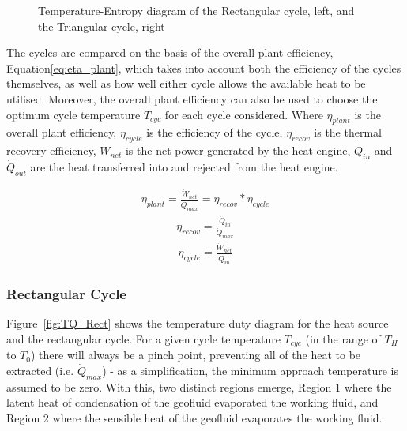         \begin{figure}[H]
            \centering
            
            \caption{Temperature-Entropy diagram of the Rectangular cycle, left, and the Triangular cycle, right}
            \label{fig:litrev_Cycles}
        \end{figure}

        The cycles are compared on the basis of the overall plant efficiency, Equation\ref{eq:eta_plant}, which takes into account both the efficiency of the cycles themselves, as well as how well either cycle allows the available heat to be utilised. Moreover, the overall plant efficiency can also be used to choose the optimum cycle temperature \(T_{cyc}\) for each cycle considered. Where \(\eta_{plant}\) is the overall plant efficiency, \(\eta_{cycle}\) is the efficiency of the cycle, \(\eta_{recov}\) is the thermal recovery efficiency, \(\Dot{W}_{net}\) is the net power generated by the heat engine, \(\Dot{Q}_{in}\) and \(\Dot{Q}_{out}\) are the heat transferred into and rejected from the heat engine.

        \begin{align}
            \eta_{plant} = \frac{\Dot{W}_{net}}{\Dot{Q}_{max}} = \eta_{recov}*\eta_{cycle} \label{eq:eta_plant}
        \end{align}
        \begin{align}
            \eta_{recov} = \frac{\Dot{Q}_{in}}{\Dot{Q}_{max}} \label{eq:eta_recov}
        \end{align}
        \begin{align}
            \eta_{cycle} = \frac{\Dot{W}_{net}}{\Dot{Q}_{in}} \label{eq:eta_cycle}
        \end{align}

        \subsubsection{Rectangular Cycle}

        Figure~\ref{fig:TQ_Rect} shows the temperature duty diagram for the heat source and the rectangular cycle. For a given cycle temperature \(T_{cyc}\) (in the range of \(T_H\) to \(T_0\)) there will always be a pinch point, preventing all of the heat to be extracted (i.e. \(\Dot{Q}_{max}\)) - as a simplification, the minimum approach temperature is assumed to be zero. With this, two distinct regions emerge, Region 1 where the latent heat of condensation of the geofluid evaporated the working fluid, and Region 2 where the sensible heat of the geofluid evaporates the working fluid.

